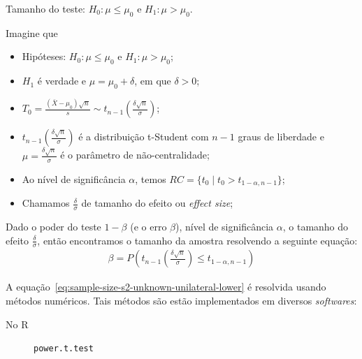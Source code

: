 \documentclass[8pt]{beamer}
\begin{document}
\begin{frame}{Tamanho do teste: $H_0:\mu \leq \mu_0$ e $H_1: \mu > \mu_0$.}

\small

Imagine que
\begin{itemize}
\item Hipóteses: $H_0: \mu \leq \mu_0$ e $H_1: \mu > \mu_0$;
\item $H_1$ é verdade e $\mu = \mu_0 + \delta$, em que $\delta > 0$;
\item $T_0 = \frac{(\bar{X} - \mu_0)\sqrt{n}}{s}  \sim t_{n-1}\left( \frac{\delta \sqrt{n}}{\sigma} \right)$;
\item $t_{n-1}\left(\frac{\delta\sqrt{n}}{\sigma}\right)$ é a distribuição t-Student com $n-1$ graus de liberdade e $\mu=\frac{\delta \sqrt{n}}{\sigma}$ é o parâmetro de não-centralidade;
\item Ao nível de significância $\alpha$, temos $RC = \{ t_0 \mid t_0 > t_{1-\alpha, n-1}   \}$;
\item Chamamos $\frac{\delta}{\sigma}$ de tamanho do efeito ou \textit{effect size};
\end{itemize}
\vfill

Dado o poder do teste $1-\beta$ (e o erro $\beta$), nível de significância $\alpha$, o tamanho do efeito $\frac{\delta}{\sigma}$, então encontramos o tamanho da amostra resolvendo a seguinte equação:
\begin{align}\label{eq:sample-size-s2-unknown-unilateral-lower}
\beta = P\left( t_{n-1}\left( \frac{\delta\sqrt{n}}{\sigma}\right) \leq t_{1-\alpha, n-1}  \right)
\end{align}

A equação~\eqref{eq:sample-size-s2-unknown-unilateral-lower} é resolvida usando métodos numéricos. Tais métodos são estão implementados em diversos \textit{softwares}:
\begin{description}
\item[No R] \texttt{power.t.test}
\end{description}

\normalsize

\end{frame}
\end{document}
